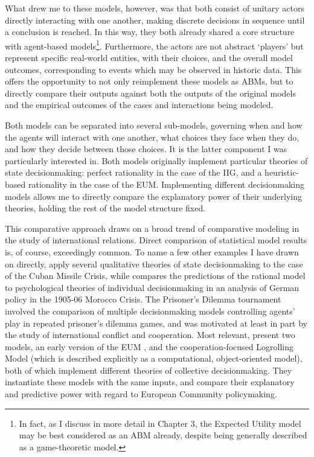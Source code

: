 What drew me to these models, however, was that both consist of unitary actors directly interacting with one another, making discrete decisions in sequence until a conclusion is reached. In this way, they both already shared a core structure with agent-based models\footnote{In fact, as I discuss in more detail in Chapter 3, the Expected Utility model may be best considered as an ABM already, despite being generally described as a game-theoretic model.}. Furthermore, the actors are not abstract `players' but represent specific real-world entities, with their choices, and the overall model outcomes, corresponding to events which may be observed in historic data. This offers the opportunity to not only reimplement these models as ABMs, but to directly compare their outputs against both the outputs of the original models and the empirical outcomes of the cases and interactions being modeled.

Both models can be separated into several sub-models, governing when and how the agents will interact with one another, what choices they face when they do, and how they decide between those choices. It is the latter component I was particularly interested in. Both models originally implement particular theories of state decisionmaking: perfect rationality in the case of the IIG, and a heuristic-based rationality in the case of the EUM. Implementing different decisionmaking models allows me to directly compare the explanatory power of their underlying theories, holding the rest of the model structure fixed.

This comparative approach draws on a broad trend of comparative modeling in the study of international relations. Direct comparison of statistical model results is, of course, exceedingly common. To name a few other examples I have drawn on directly, \citet{allison_1999} apply several qualitative theories of state decisionmaking to the case of the Cuban Missile Crisis, while \citet{kaufmann_1994} compares the predictions of the rational model to psychological theories of individual decisionmaking in an analysis of German policy in the 1905-06 Morocco Crisis. The \citet{axelrod_1980} Prisoner's Dilemma tournament involved the comparison of multiple decisionmaking models controlling agents' play in repeated prisoner's dilemma games, and was motivated at least in part by the study of international conflict and cooperation. Most relevant, \citet{stokman_1994b} present two models, an early version of the EUM \citep{bdm_1994}, and the \citet{stokman_1994} cooperation-focused Logrolling Model (which is described explicitly as a computational, object-oriented model), both of which implement different theories of collective decisionmaking. They instantiate these models with the same inputs, and compare their explanatory and predictive power with regard to European Community policymaking.

